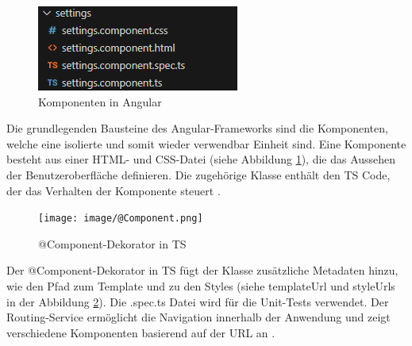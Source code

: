 \begin{figure}[h]
    \centering
    \includegraphics[clip,width=0.5\linewidth]{../prefix/image/Komponente.png}
    \caption[Komponenten in Angular]{Komponenten in Angular}
    \label{KomponentenAngular}
\end{figure}

Die grundlegenden Bausteine des Angular-Frameworks sind die Komponenten, welche eine isolierte und somit wieder verwendbar Einheit sind. 
Eine Komponente besteht aus einer HTML- und CSS-Datei (siehe Abbildung \ref{KomponentenAngular}), die das Aussehen der Benutzeroberfläche definieren. Die zugehörige Klasse enthält den TS Code, der das Verhalten der Komponente steuert \cite{angular_arch}.

\begin{figure}[h]
    \centering
    \texttt{[image: image/@Component.png]}
    \caption[@Component-Dekorator in TS]{@Component-Dekorator in TS}
    \label{Component}
\end{figure}

Der @Component-Dekorator in TS fügt der Klasse zusätzliche Metadaten hinzu, wie den Pfad zum Template und zu den Styles (siehe templateUrl und styleUrls in der Abbildung \ref{Component}). Die .spec.ts Datei wird für die Unit-Tests verwendet.
Der Routing-Service ermöglicht die Navigation innerhalb der Anwendung und zeigt verschiedene Komponenten basierend auf der URL an \cite{angular_arch}.

